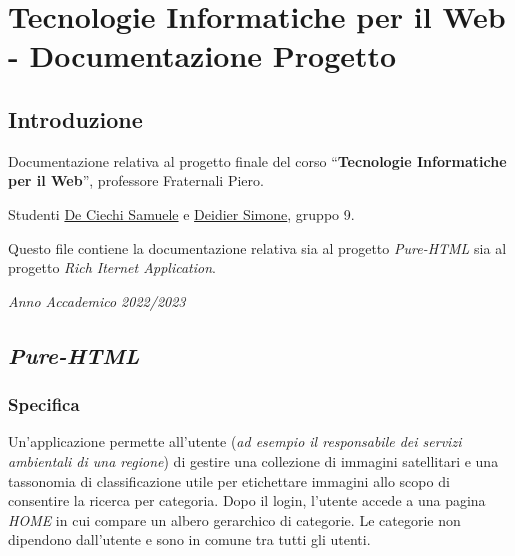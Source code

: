 \pagebreak

\hypertarget{tecnologie-informatiche-per-il-web---documentazione-progetto}{%
\section{Tecnologie Informatiche per il Web - Documentazione
Progetto}\label{tecnologie-informatiche-per-il-web---documentazione-progetto}}

\hypertarget{introduzione}{%
\subsection{Introduzione}\label{introduzione}}

Documentazione relativa al progetto finale del corso
``\textbf{Tecnologie Informatiche per il Web}'', professore Fraternali
Piero.

Studenti \href{https://github.com/Samdec01}{De Ciechi Samuele} e
\href{https://github.com/SimoneDeidier}{Deidier Simone}, gruppo 9.

Questo file contiene la documentazione relativa sia al progetto
\emph{Pure-HTML} sia al progetto \emph{Rich Iternet
Application}.\newline\newline\newline

\emph{Anno Accademico 2022/2023}

\pagebreak

\hypertarget{pure-html}{%
\subsection{\texorpdfstring{\emph{Pure-HTML}}{Pure-HTML}}\label{pure-html}}

\hypertarget{specifica}{%
\subsubsection{Specifica}\label{specifica}}

Un'applicazione permette all'utente (\emph{ad esempio il responsabile
dei servizi ambientali di una regione}) di gestire una collezione di
immagini satellitari e una tassonomia di classificazione utile per
etichettare immagini allo scopo di consentire la ricerca per categoria.
Dopo il login, l'utente accede a una pagina \emph{HOME} in cui compare
un albero gerarchico di categorie. Le categorie non dipendono
dall'utente e sono in comune tra tutti gli utenti.

